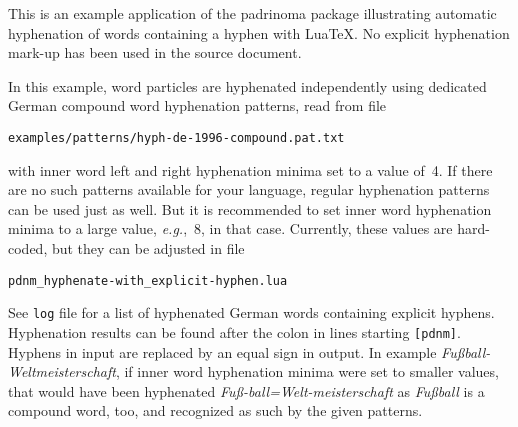 \documentclass{article}
\begin{document}
This is an example application of the padrinoma package illustrating
automatic hyphenation of words containing a hyphen with Lua\TeX.  No
explicit hyphenation mark-up has been used in the source document.

In this example, word particles are hyphenated independently using
dedicated German compound word hyphenation patterns, read from file
\begin{center}
\verb+examples/patterns/hyph-de-1996-compound.pat.txt+
\end{center}
with inner word left and right hyphenation minima set to a value of~4.
If there are no such patterns available for your language, regular
hyphenation patterns can be used just as well.  But it is recommended to
set inner word hyphenation minima to a large value, \emph{e.g.},~8, in
that case.  Currently, these values are hard-coded, but they can be
adjusted in file
\begin{center}
\verb+pdnm_hyphenate-with_explicit-hyphen.lua+
\end{center}

See \texttt{log} file for a list of hyphenated German words containing
explicit hyphens.  Hyphenation results can be found after the colon in
lines starting \verb+[pdnm]+.  Hyphens in input are replaced by an equal
sign in output.  In example \emph{Fußball-Weltmeisterschaft}, if inner
word hyphenation minima were set to smaller values, that would have been
hyphenated \emph{Fuß-ball=Welt-meisterschaft} as \emph{Fußball} is a
compound word, too, and recognized as such by the given patterns.

\begin{otherlanguage}{ngerman}
\end{otherlanguage}
\end{document}
